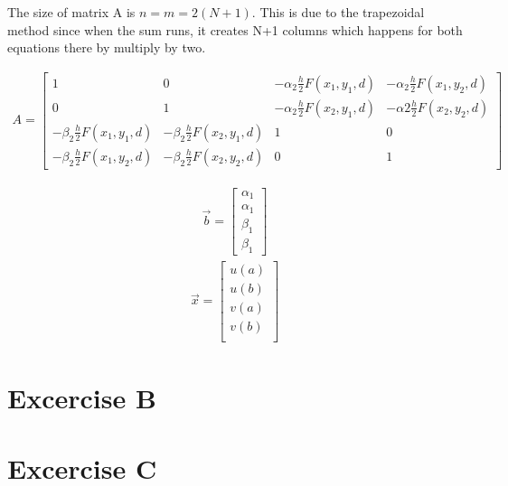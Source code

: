 \documentclass[10pt,a4paper]{article}
\begin{document}
The size of matrix A is $n=m=2(N+1)$. This is due to the trapezoidal method since when the sum runs, it creates N+1 columns which happens for both equations there by multiply by two.

\begin{align}
A = 
 \begin{bmatrix}
  1 & 0 & -\alpha_{2}\frac{h}{2}F(x_{1},y_{1},d) & -\alpha_{2}\frac{h}{2}F(x_{1},y_{2},d) \\
  0 & 1 & -\alpha_{2}\frac{h}{2}F(x_{2},y_{1},d) & -\alpha{2}\frac{h}{2}F(x_{2},y_{2},d) \\
  -\beta_{2}\frac{h}{2}F(x_{1},y_{1},d)  & -\beta_{2}\frac{h}{2}F(x_{2},y_{1},d)  & 1 & 0  \\
  -\beta_{2}\frac{h}{2}F(x_{1},y_{2},d)  & -\beta_{2}\frac{h}{2}F(x_{2},y_{2},d)  & 0 & 1 
 \end{bmatrix} 
\end{align} 



\begin{multicols}{2}
  \null \vfill
	\begin{align*}
		\overrightarrow{b} = \begin{bmatrix}
			\alpha_{1} \\
			\alpha_{1} \\
			\beta_{1} \\
			\beta_{1}
		\end{bmatrix}
	\end{align*}
\break
  \vfill \null    
	\begin{align*}
		\overrightarrow{x} = \begin{bmatrix}
  			u(a) \\
  			u(b) \\
  			v(a) \\
  			v(b) \\
 	 	\end{bmatrix}
	\end{align*}
\end{multicols}



\section{Excercise B}
\section{Excercise C}
\end{document}
